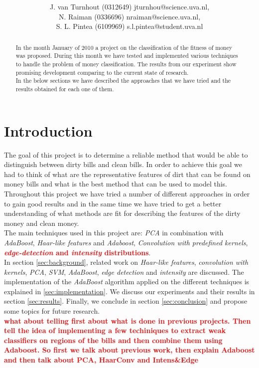 \documentclass[11pt,twocolumn]{article}
\title{\tbf{Dirty Money:}\\\tbf{Feature selection using AdaBoost}}
\author{J. van Turnhout (0312649) jturnhou@science.uva.nl, \\ N. Raiman (0336696) nraiman@science.uva.nl, \\ S. L. Pintea (6109969) s.l.pintea@student.uva.nl}
\newcommand{\todo}[1]{\textcolor{red}{\textbf{#1}}}
\begin{document}
	\maketitle
	\begin{abstract}
		\hspace*{10px}In the month January of 2010 a project on the classification of
		the fitness of money was proposed. During this month we have tested and
		implemented various techniques to handle the problem of money classification.
		The results from our experiment show promising development comparing to the
		current state of research.\\ 
		\hspace*{10px}In the below sections we have described the approaches that we
		have tried and the results obtained for each one of them.
	\end{abstract}

	\section{Introduction}
		\hspace*{10px}The goal of this project is to determine a reliable method that
		would be able to distinguish between dirty bills and clean bills. In order to
		achieve this goal we had to think of what are the representative features of
		dirt that can be found on money bills and what is the best method that can be
		used to model this.\\  
		\hspace*{10px}Throughout this project we have tried a number of different
		approaches in order to gain good results and in the same time we have tried
		to get a better understanding of what methods are fit for describing the
		features of the dirty money and clean money.\\ 
		\hspace*{10px}The main techniques used in this project are: \emph{PCA} in
		combination with \emph{AdaBoost}, \emph{Haar-like features} and
		\emph{Adaboost}, \emph{Convolution with predefined kernels},
		\todo{\emph{edge-detection} and \emph{intensity} distributions}.\\ 
		\hspace*{10px}In section \ref{sec:background}, related work on
		\emph{Haar-like features}, \emph{convolution with kernels}, \emph{PCA},
		\emph{SVM}, \emph{AdaBoost}, \emph{edge detection} and \emph{intensity} are
		discussed. The implementation of the \emph{AdaBoost} algorithm applied on the
		different techniques is explained in \ref{sec:implementation}. We discuss our
		experiments and their results in section \ref{sec:results}. Finally, we
		conclude in section \ref{sec:conclusion} and propose some topics for future
		research.\\ 
		\todo{what about telling first about what is done in previous projects. Then
		tell the idea of implementing a few techiniques to extract weak classifiers
		on regions of the bills and then combine them using Adaboost. So first we
		talk about previous work, then explain Adaboost and then talk about PCA,
		HaarConv and Intens\&Edge}
	
\end{document}
